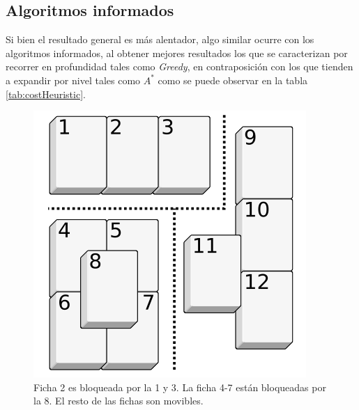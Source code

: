 \documentclass{sig-alternate}
\begin{document}
\subsection*{Algoritmos informados}
Si bien el resultado general es m\'as alentador, algo similar ocurre con los algoritmos informados, al obtener mejores resultados los que se caracterizan por recorrer en profundidad tales como \emph{Greedy}, en contraposici\'on con los que tienden a expandir por nivel tales como \emph{$A^*$} como se puede observar en la tabla \ref{tab:costHeuristic}.

\onecolumn

\begin{figure}[h!]
  \begin{center}
  	\includegraphics[scale=0.3]{images/blocking.png}
  \end{center}
  \caption{Ficha 2 es bloqueada por la 1 y 3. La ficha 4-7 est\'an bloqueadas por la 8. El resto de las fichas son movibles.}
  \label{fig:blocking}
\end{figure}
\end{document}
